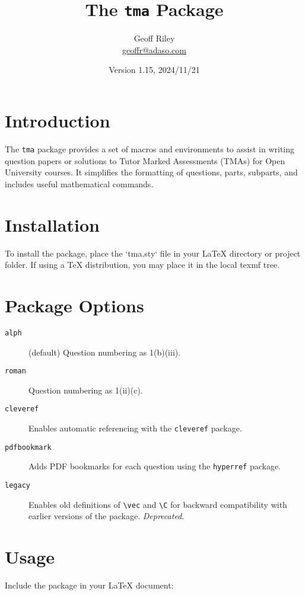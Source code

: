 \documentclass[a4paper,11pt,twoside]{article}
\title{The \texttt{tma} Package}
\author{Geoff Riley \\ \href{mailto:geoffr@adaso.com.com}{geoffr@adaso.com}}
\date{Version 1.15, 2024/11/21}
\begin{document}
	
	\maketitle
	
	\tableofcontents
	
	\section{Introduction}
	
	The \texttt{tma} package provides a set of macros and environments to assist in writing question papers or solutions to Tutor Marked Assessments (TMAs) for Open University courses. It simplifies the formatting of questions, parts, subparts, and includes useful mathematical commands.
	
	\section{Installation}
	
	To install the package, place the `tma.sty` file in your LaTeX directory or project folder. If using a TeX distribution, you may place it in the local texmf tree.
	
	\section{Package Options}
	
	\begin{description}
		\item[\texttt{alph}] (default) Question numbering as 1(b)(iii).
		\item[\texttt{roman}] Question numbering as 1(ii)(c).
		\item[\texttt{cleveref}] Enables automatic referencing with the \texttt{cleveref} package.
		\item[\texttt{pdfbookmark}] Adds PDF bookmarks for each question using the \texttt{hyperref} package.
		\item[\texttt{legacy}] Enables old definitions of \verb|\vec| and \verb|\C| for backward compatibility with earlier versions of the package. \emph{Deprecated}.
	\end{description}
	
	\section{Usage}
	
	Include the package in your LaTeX document:
	
\end{document}
